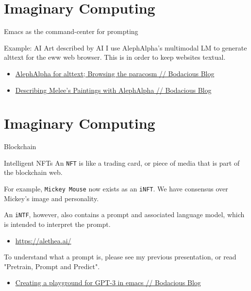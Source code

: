 \documentclass[presentation]{beamer}
\begin{document}
\section{Imaginary Computing}
\label{sec:org06e2359}
\begin{frame}[label={sec:orgab8d9d9}]{Emacs as the command-center for prompting}
\begin{block}{Example: AI Art described by AI}
I use AlephAlpha’s multimodal LM to generate
alttext for the eww web browser. This is in
order to keep websites textual.

\begin{itemize}
\item \href{https://mullikine.github.io/posts/alephalpha-for-alttext/}{AlephAlpha for alttext; Browsing the paracosm // Bodacious Blog}
\item \href{https://mullikine.github.io/posts/describing-melee-s-paintings-with-alephalpha/}{Describing Melee's Paintings with AlephAlpha // Bodacious Blog}
\end{itemize}
\end{block}
\end{frame}

\section{Imaginary Computing}
\label{sec:org1defc0e}
\begin{frame}[label={sec:org1054cab},fragile]{Blockchain}
 \begin{block}{Intelligent NFTs}
An \texttt{NFT} is like a trading card, or piece of media that is part of the blockchain web.

For example, \texttt{Mickey Mouse} now exists as an
\texttt{iNFT}. We have consensus over Mickey's image
and personality.

An \texttt{iNTF}, however, also contains a prompt and associated language model, which is intended to interpret the prompt.
\begin{itemize}
\item \url{https://alethea.ai/}
\end{itemize}

To understand what a prompt is, please see my
previous presentation, or read "Pretrain,
Prompt and Predict".

\begin{itemize}
\item \href{https://mullikine.github.io/posts/creating-a-playground-for-gpt-3-in-emacs/}{Creating a playground for GPT-3 in emacs // Bodacious Blog}
\end{itemize}
\end{block}
\end{frame}
\end{document}
